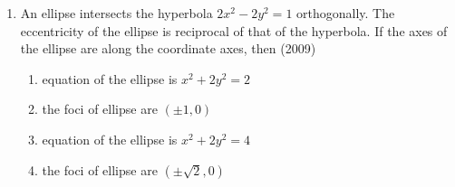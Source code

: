 \documentclass[journal,12pt,onecolumn]{IEEEtran}
\theoremstyle{remark}
\begin{document}
\begin{enumerate}
	\item An ellipse intersects the hyperbola $2x^2-2y^2=1$ orthogonally. The eccentricity of the ellipse is reciprocal of that of the hyperbola. If the axes of the ellipse are along the coordinate axes, then \hfill (2009)\\
		\begin{enumerate}
			\item equation of the ellipse is $x^2+2y^2=2$
			\item the foci of ellipse are $(\pm1,0)$
			\item equation of the ellipse is $x^2+2y^2=4$
			\item the foci of ellipse are $(\pm\sqrt{2},0)$
		\end{enumerate}











\end{enumerate}
\end{document}
